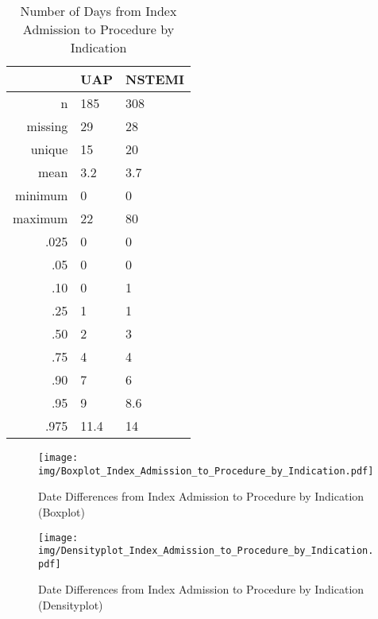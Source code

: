 \documentclass[presentation,xcolor=pdftex,dvipsnames,table,11pt]{beamer}
\begin{document}
\begin{tiny}
\begin{table}[ht]
\centering
\begin{tabular}{rll}
  \toprule
 & UAP & NSTEMI \\ 
  \midrule
n & 185 & 308 \\ 
  missing & 29 & 28 \\ 
  unique & 15 & 20 \\ 
  mean & 3.2 & 3.7 \\ 
  minimum & 0 & 0 \\ 
  maximum & 22 & 80 \\ 
  .025 & 0 & 0 \\ 
  .05 & 0 & 0 \\ 
  .10 & 0 & 1 \\ 
  .25 & 1 & 1 \\ 
  .50 & 2 & 3 \\ 
  .75 & 4 & 4 \\ 
  .90 & 7 & 6 \\ 
  .95 & 9 & 8.6 \\ 
  .975 & 11.4 & 14 \\ 
   \bottomrule
\end{tabular}
\caption{Number of Days from Index Admission to Procedure by Indication} 
\end{table}
\begin{frame}
\begin{figure}
  \centering
  \caption{Date Differences from Index Admission to Procedure by Indication (Boxplot)}
  \label{Boxplot: Date Differences from Index Admission to Procedure by Indication}
\texttt{[image: img/Boxplot\_Index\_Admission\_to\_Procedure\_by\_Indication.pdf]}\end{figure}
\end{frame}


\begin{frame}
\begin{figure}
  \centering
  \caption{Date Differences from Index Admission to Procedure by Indication (Densityplot)}
  \label{Density: Date Differences from Index Admission to Procedure by Indication}
\texttt{[image: img/Densityplot\_Index\_Admission\_to\_Procedure\_by\_Indication.pdf]}\end{figure}
\end{frame}






\end{tiny}
\end{document}
